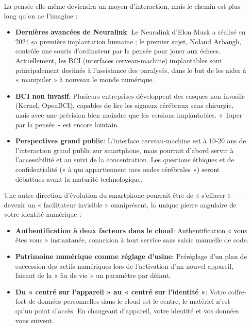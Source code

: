 La pensée elle-même deviendra un moyen d'interaction, mais le chemin est plus long qu'on ne l'imagine :

\begin{itemize}
  \item \textbf{Dernières avancées de Neuralink}: Le Neuralink d'Elon Musk a réalisé en 2024 sa première implantation humaine ; le premier sujet, Noland Arbaugh, contrôle une souris d'ordinateur par la pensée pour jouer aux échecs. Actuellement, les BCI (interfaces cerveau-machine) implantables sont principalement destinés à l'assistance des paralysés, dans le but de les aider à « manipuler » à nouveau le monde numérique.
  \item \textbf{BCI non invasif}: Plusieurs entreprises développent des casques non invasifs (Kernel, OpenBCI), capables de lire les signaux cérébraux sans chirurgie, mais avec une précision bien moindre que les versions implantables. « Taper par la pensée » est encore lointain.
  \item \textbf{Perspectives grand public}: L'interface cerveau-machine est à 10-20 ans de l'interaction grand public sur smartphone, mais pourrait d'abord servir à l'accessibilité et au suivi de la concentration. Les questions éthiques et de confidentialité (« à qui appartiennent mes ondes cérébrales ») seront débattues avant la maturité technologique.
\end{itemize}


Une autre direction d'évolution du smartphone pourrait être de « s'effacer » — devenir un « facilitateur invisible » omniprésent, la unique pierre angulaire de votre identité numérique :

\begin{itemize}
  \item \textbf{Authentification à deux facteurs dans le cloud}: Authentification « vous êtes vous » instantanée, connexion à tout service sans saisie manuelle de code.
  \item \textbf{Patrimoine numérique comme réglage d'usine}: Préréglage d'un plan de succession des actifs numériques lors de l'activation d'un nouvel appareil, faisant de la « fin de vie » un paramètre par défaut.
  \item \textbf{Du « centré sur l'appareil » au « centré sur l'identité »}: Votre coffre-fort de données personnelles dans le cloud est le centre, le matériel n'est qu'un point d'accès. En changeant d'appareil, votre identité et vos données vous suivent.
\end{itemize}


